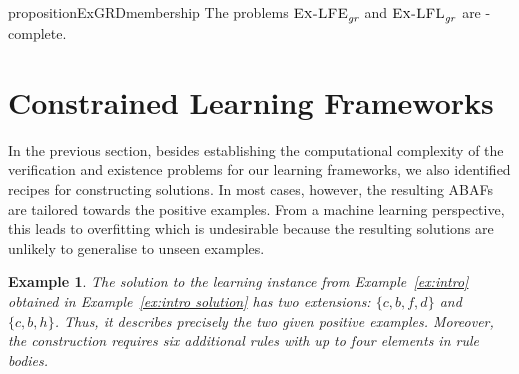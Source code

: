 \documentclass[letterpaper]{article} %
\newcommand{\TODO}[1]{\todo[inline]{ #1}}
\newcommand{\grd}{\textit{gr}}
\newcommand{\asms}{\asm}
\newcommand{\asm}{\ensuremath{\mathcal{A}}}
\newcommand{\contrary}[1]{c(#1)}
\newcommand{\ExLFE}[2]{\textsc{Ex-LFE}_{#1}^{#2}}
\newcommand{\ExLFL}[2]{\textsc{Ex-LFL}_{#1}^{#2}}
\newtheorem{example}{Example}[section]
\begin{document}
\begin{restatable}{proposition}{ExGRDmembership}
    The problems 
    $\ExLFE{\grd}{}$ and $\ExLFL{\grd}{}$ are \NP-complete.
\end{restatable}



\section{Constrained Learning Frameworks}

In the previous section, besides establishing the computational complexity of the verification and existence problems for our learning frameworks, we also identified recipes for constructing solutions. In most cases, however, the resulting ABAFs are tailored towards the positive examples. From a machine learning perspective, this leads to overfitting which is undesirable because the resulting solutions are unlikely to generalise to unseen examples. 
%
\begin{example}
    The solution to the learning instance from Example~\ref{ex:intro} obtained in Example~\ref{ex:intro solution} has two extensions: $\{c,b,f,d\}$ and $\{c,b,h\}$. Thus, it describes precisely the two given positive examples. Moreover, the construction requires six additional rules with up to four elements in rule bodies.
\end{example}
\end{document}
